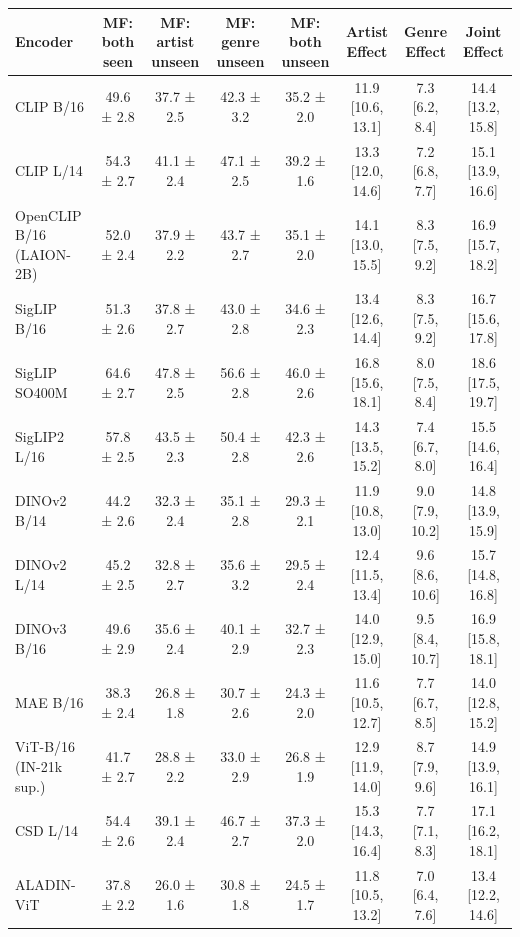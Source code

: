 \begin{tabular}{lccccccc}
\toprule
Encoder & MF: both seen & MF: artist unseen & MF: genre unseen & MF: both unseen & Artist Effect & Genre Effect & Joint Effect \\
\midrule
CLIP B/16 & 49.6 ± 2.8 & 37.7 ± 2.5 & 42.3 ± 3.2 & 35.2 ± 2.0 & 11.9 [10.6, 13.1] & 7.3 [6.2, 8.4] & 14.4 [13.2, 15.8] \\
CLIP L/14 & 54.3 ± 2.7 & 41.1 ± 2.4 & 47.1 ± 2.5 & 39.2 ± 1.6 & 13.3 [12.0, 14.6] & 7.2 [6.8, 7.7] & 15.1 [13.9, 16.6] \\
OpenCLIP B/16 (LAION-2B) & 52.0 ± 2.4 & 37.9 ± 2.2 & 43.7 ± 2.7 & 35.1 ± 2.0 & 14.1 [13.0, 15.5] & 8.3 [7.5, 9.2] & 16.9 [15.7, 18.2] \\
SigLIP B/16 & 51.3 ± 2.6 & 37.8 ± 2.7 & 43.0 ± 2.8 & 34.6 ± 2.3 & 13.4 [12.6, 14.4] & 8.3 [7.5, 9.2] & 16.7 [15.6, 17.8] \\
SigLIP SO400M & 64.6 ± 2.7 & 47.8 ± 2.5 & 56.6 ± 2.8 & 46.0 ± 2.6 & 16.8 [15.6, 18.1] & 8.0 [7.5, 8.4] & 18.6 [17.5, 19.7] \\
SigLIP2 L/16 & 57.8 ± 2.5 & 43.5 ± 2.3 & 50.4 ± 2.8 & 42.3 ± 2.6 & 14.3 [13.5, 15.2] & 7.4 [6.7, 8.0] & 15.5 [14.6, 16.4] \\
DINOv2 B/14 & 44.2 ± 2.6 & 32.3 ± 2.4 & 35.1 ± 2.8 & 29.3 ± 2.1 & 11.9 [10.8, 13.0] & 9.0 [7.9, 10.2] & 14.8 [13.9, 15.9] \\
DINOv2 L/14 & 45.2 ± 2.5 & 32.8 ± 2.7 & 35.6 ± 3.2 & 29.5 ± 2.4 & 12.4 [11.5, 13.4] & 9.6 [8.6, 10.6] & 15.7 [14.8, 16.8] \\
DINOv3 B/16 & 49.6 ± 2.9 & 35.6 ± 2.4 & 40.1 ± 2.9 & 32.7 ± 2.3 & 14.0 [12.9, 15.0] & 9.5 [8.4, 10.7] & 16.9 [15.8, 18.1] \\
MAE B/16 & 38.3 ± 2.4 & 26.8 ± 1.8 & 30.7 ± 2.6 & 24.3 ± 2.0 & 11.6 [10.5, 12.7] & 7.7 [6.7, 8.5] & 14.0 [12.8, 15.2] \\
ViT-B/16 (IN-21k sup.) & 41.7 ± 2.7 & 28.8 ± 2.2 & 33.0 ± 2.9 & 26.8 ± 1.9 & 12.9 [11.9, 14.0] & 8.7 [7.9, 9.6] & 14.9 [13.9, 16.1] \\
CSD L/14 & 54.4 ± 2.6 & 39.1 ± 2.4 & 46.7 ± 2.7 & 37.3 ± 2.0 & 15.3 [14.3, 16.4] & 7.7 [7.1, 8.3] & 17.1 [16.2, 18.1] \\
ALADIN-ViT & 37.8 ± 2.2 & 26.0 ± 1.6 & 30.8 ± 1.8 & 24.5 ± 1.7 & 11.8 [10.5, 13.2] & 7.0 [6.4, 7.6] & 13.4 [12.2, 14.6] \\
\bottomrule
\end{tabular}
